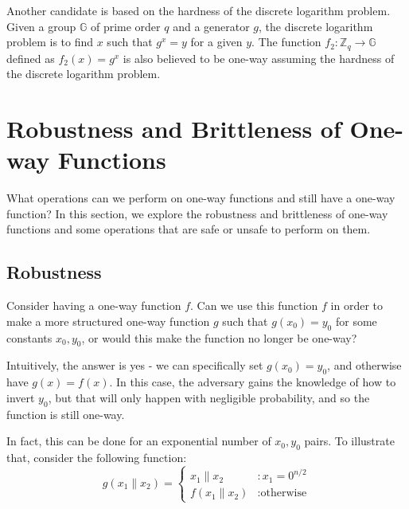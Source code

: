 
Another candidate is based on the hardness of the discrete logarithm problem. Given a group $\mathbb{G}$ of prime order $q$ and a generator $g$, the discrete logarithm problem is to find $x$ such that $g^x = y$ for a given $y$. The function $f_2 : \mathbb{Z}_q \rightarrow \mathbb{G}$ defined as $f_2(x) = g^x$ is also believed to be one-way assuming the hardness of the discrete logarithm problem.


\section{Robustness and Brittleness of One-way Functions}
What operations can we perform on one-way functions and still have a one-way function? In this section, we explore the robustness and brittleness of one-way functions and some operations that are safe or unsafe to perform on them.

\subsection{Robustness}
Consider having a one-way function $f$.  Can we use this function $f$ in order to make a more structured one-way function $g$ such that $g(x_0) = y_0$ for some constants $x_0, y_0$, or would this make the function no longer be one-way? 

Intuitively, the answer is yes - we can specifically set $g(x_0) = y_0$, and otherwise have $g(x) = f(x)$.  In this case, the adversary gains the knowledge of how to invert $y_0$, but that will only happen with negligible probability, and so the function is still one-way.


In fact, this can be done for an exponential number of $x_0, y_0$ pairs. To illustrate that, consider the following function:
\[
  g(x_1\|x_2) = \left\{ \begin{array}{ll} x_1\|x_2 & : x_1 = 0^{n/2} \\ f(x_1\|x_2) & : \text{otherwise} \end{array} \right.
\]

